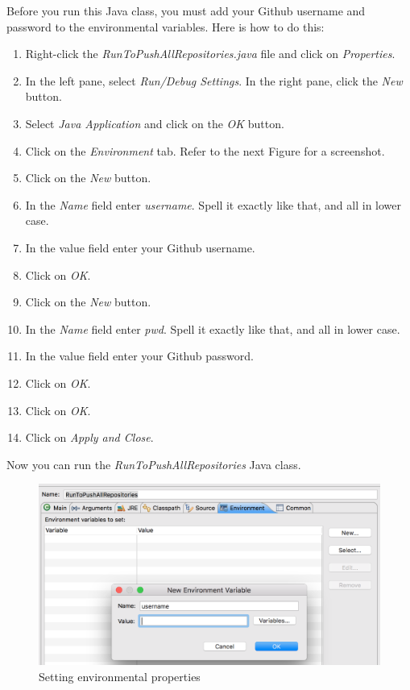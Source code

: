 \documentclass[]{memoir}
\begin{document}
Before you run this Java class, you must add your Github username and password to the environmental variables.  Here is how to do this:

\begin{enumerate}
    \item Right-click the \textit{RunToPushAllRepositories.java} file and click on \textit{Properties}. 
    \item In the left pane, select \textit{Run/Debug Settings}.
    In the right pane, click the \textit{New} button.
    \item Select \textit{Java Application} and click on the \textit{OK} button.
    \item Click on the \textit{Environment} tab.  Refer to the next Figure for a screenshot.
    \item Click on the \textit{New} button.
    \item In the \textit{Name} field enter \textit{username}.  Spell it exactly like that, and all in lower case.
    \item In the value field enter your Github username.
    \item Click on \textit{OK}.
        \item Click on the \textit{New} button.
    \item In the \textit{Name} field enter \textit{pwd}.  Spell it exactly like that, and all in lower case.
    \item In the value field enter your Github password.
    \item Click on \textit{OK}.
    \item Click on \textit{OK}.
    \item Click on \textit{Apply and Close}.
\end{enumerate}

Now you can run the \textit{RunToPushAllRepositories} Java class.

\begin{figure}[h!]

  \begin{center}
\includegraphics[scale=0.50]{alwb-user-guide/system/images/ioc-liturgical-db-public-app/envPropUsername.png}
\end{center}
  \caption{Setting environmental properties}
\end{figure}
\end{document}
